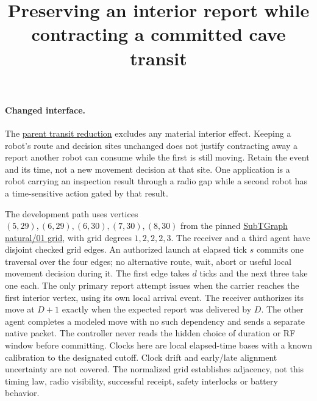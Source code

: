 \documentclass[11pt]{article}
\title{Preserving an interior report while contracting a committed cave transit}
\author{}\date{}
\begin{document}
\maketitle

\paragraph{Changed interface.}
The \href{https://github.com/eternal-november/eos-research-programmes/pull/378}{parent
transit reduction} excludes any material interior effect. Keeping a
robot's route and decision sites unchanged does not justify contracting
away a report another robot can consume while the first is still moving.
Retain the event and its time, not a new movement decision at that site.
One application is a robot carrying an inspection result through a radio
gap while a second robot has a time-sensitive action gated by that result.

The development path uses vertices
\((5,29),(6,29),(6,30),(7,30),(8,30)\) from the pinned
\href{https://github.com/LTU-RAI/SubTGraph/tree/21a1bcabf37c8f2f6f236ba40b916094d9903b5b/benchmark}{SubTGraph
natural/01 grid}, with grid degrees \(1,2,2,2,3\).
The receiver and a third agent have disjoint checked grid edges.
An authorized launch at elapsed tick \(s\) commits one traversal over
the four edges; no alternative route, wait, abort or useful local
movement decision during it. The first edge takes \(d\) ticks and the next
three take one each. The only primary report attempt issues when the
carrier reaches the first interior vertex, using its own local arrival
event. The receiver authorizes its move at \(D+1\) exactly when the
expected report was delivered by \(D\). The other agent completes a
modeled move with no such dependency and sends a separate native packet.
The controller never reads the hidden choice of duration or RF window
before committing. Clocks here are local elapsed-time bases with a known
calibration to the designated cutoff. Clock drift and early/late
alignment uncertainty are not covered. The normalized grid establishes
adjacency, not this timing law, radio visibility, successful receipt,
safety interlocks or battery behavior.
\end{document}

